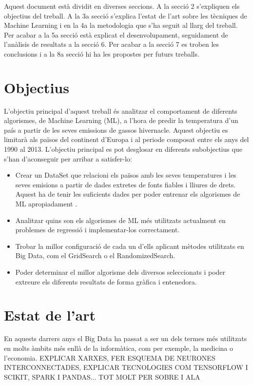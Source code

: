 \documentclass[10pt,a4paper,twocolumn,twoside]{article}
\begin{document}
Aquest document està dividit en diverses seccions. A la secció 2 s'expliquen els objectius del treball. A la 3a secció s'explica l'estat de l'art sobre les tècniques de Machine Learning i en la 4a la metodologia que s'ha seguit al llarg del treball. Per acabar a la 5a secció està explicat el desenvolupament, seguidament de l'anàlisis de resultats a la secció 6. Per acabar a la secció 7 es troben les conclusions i a la 8a secció hi ha les propostes per futurs treballs.   
\section{Objectius}
L'objectiu principal d'aquest treball és analitzar el comportament de diferents algorismes, de Machine Learning (ML), a l'hora de predir la temperatura d'un país a partir de les seves emissions de gassos hivernacle. Aquest objectiu es limitarà als països del continent d'Europa i al periode composat entre els anys del 1990 al 2013. L'objectiu principal es pot desglosar en diferents subobjectius que s'han d'aconseguir per arribar a satisfer-lo:
\begin{itemize}
\item Crear un DataSet que relacioni els països amb les seves temperatures i les seves emisions a partir de dades extretes de fonts fiables i lliures de drets. Aquest ha de tenir les suficients dades per poder entrenar els algorismes de ML apropiadament .
\item Analitzar quins son els algorismes de ML més utilitzats actualment en problemes de regressió i implementar-los correctament.
\item Trobar la millor configuració de cada un d'ells aplicant mètodes utilitzats en Big Data, com el GridSearch o el RandomizedSearch.
\item Poder determinar el millor algorisme dels diversos seleccionats i poder extreure els diferents resultats de forma gràfica i entenedora.     
\end{itemize}
\section {Estat de l'art}
En aquests darrers anys el Big Data ha passat a ser un dels termes més utilitzats en molts àmbits més enllà de la informàtica, com per exemple, la medicina o l'economia.  
EXPLICAR XARXES, FER ESQUEMA DE NEURONES INTERCONNECTADES, EXPLICAR TECNOLOGIES COM TENSORFLOW I SCIKIT, SPARK I PANDAS... TOT MOLT PER SOBRE I ALA
\end{document}
